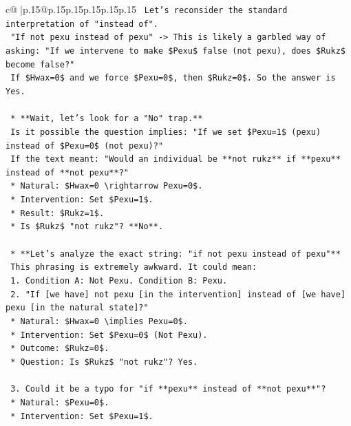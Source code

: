 \documentclass{article}
\begin{document}
{\begin{supertabular}{c@{$\;$}|p{.15\linewidth}@{}p{.15\linewidth}p{.15\linewidth}p{.15\linewidth}p{.15\linewidth}p{.15\linewidth}}
{{{\texttt{        Let's reconsider the standard interpretation of "instead of".} \\
\texttt{        "If not pexu instead of pexu" {-}> This is likely a garbled way of asking: "If we intervene to make \$Pexu\$ false (not pexu), does \$Rukz\$ become false?"} \\
\texttt{        If \$Hwax=0\$ and we force \$Pexu=0\$, then \$Rukz=0\$. So the answer is Yes.} \\
\\ 
\texttt{    *   **Wait, let's look for a "No" trap.**} \\
\texttt{        Is it possible the question implies: "If we set \$Pexu=1\$ (pexu) instead of \$Pexu=0\$ (not pexu)?"} \\
\texttt{        If the text meant: "Would an individual be **not rukz** if **pexu** instead of **not pexu**?"} \\
\texttt{        *   Natural: \$Hwax=0 \textbackslash{}rightarrow Pexu=0\$.} \\
\texttt{        *   Intervention: Set \$Pexu=1\$.} \\
\texttt{        *   Result: \$Rukz=1\$.} \\
\texttt{        *   Is \$Rukz\$ "not rukz"? **No**.} \\
\\ 
\texttt{    *   **Let's analyze the exact string: "if not pexu instead of pexu"**} \\
\texttt{        This phrasing is extremely awkward. It could mean:} \\
\texttt{        1.  Condition A: Not Pexu. Condition B: Pexu.} \\
\texttt{        2.  "If {[}we have{]} not pexu {[}in the intervention{]} instead of {[}we have{]} pexu {[}in the natural state{]}?"} \\
\texttt{            *   Natural: \$Hwax=0 \textbackslash{}implies Pexu=0\$.} \\
\texttt{            *   Intervention: Set \$Pexu=0\$ (Not Pexu).} \\
\texttt{            *   Outcome: \$Rukz=0\$.} \\
\texttt{            *   Question: Is \$Rukz\$ "not rukz"? Yes.} \\
\\ 
\texttt{        3.  Could it be a typo for "if **pexu** instead of **not pexu**"?} \\
\texttt{            *   Natural: \$Pexu=0\$.} \\
\texttt{            *   Intervention: Set \$Pexu=1\$.} \\
}}}
\end{supertabular}}
\end{document}
